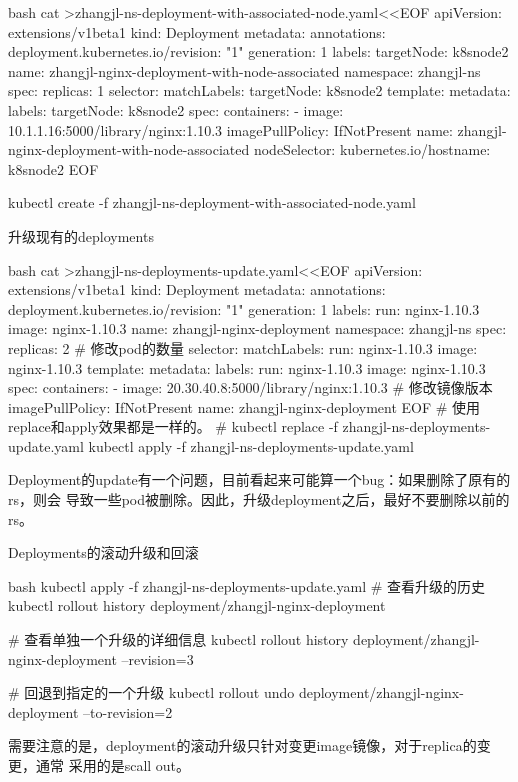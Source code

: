 \begin{outline}[enumerate]
\begin{code-in-enumerate}{bash}
cat >zhangjl-ns-deployment-with-associated-node.yaml<<EOF
apiVersion: extensions/v1beta1
kind: Deployment
metadata:
  annotations:
    deployment.kubernetes.io/revision: "1"
  generation: 1
  labels:
    targetNode: k8snode2
  name: zhangjl-nginx-deployment-with-node-associated
  namespace: zhangjl-ns
spec:
  replicas: 1
  selector:
    matchLabels:
      targetNode: k8snode2
  template:
    metadata:
      labels:
        targetNode: k8snode2
    spec:
      containers:
      - image: 10.1.1.16:5000/library/nginx:1.10.3
        imagePullPolicy: IfNotPresent
        name: zhangjl-nginx-deployment-with-node-associated
      nodeSelector:
        kubernetes.io/hostname: k8snode2
EOF

kubectl create -f zhangjl-ns-deployment-with-associated-node.yaml
\end{code-in-enumerate}

\1 升级现有的deployments
\begin{code-in-enumerate}{bash}
cat >zhangjl-ns-deployments-update.yaml<<EOF
apiVersion: extensions/v1beta1
kind: Deployment
metadata:
  annotations:
    deployment.kubernetes.io/revision: "1"
  generation: 1
  labels:
    run: nginx-1.10.3
    image: nginx-1.10.3
  name: zhangjl-nginx-deployment
  namespace: zhangjl-ns
spec:
  replicas: 2 # 修改pod的数量
  selector:
    matchLabels:
      run: nginx-1.10.3
      image: nginx-1.10.3
  template:
    metadata:
      labels:
        run: nginx-1.10.3
        image: nginx-1.10.3
    spec:
      containers:
      - image: 20.30.40.8:5000/library/nginx:1.10.3 # 修改镜像版本
        imagePullPolicy: IfNotPresent
        name: zhangjl-nginx-deployment
EOF
# 使用replace和apply效果都是一样的。
# kubectl replace -f zhangjl-ns-deployments-update.yaml
kubectl apply -f zhangjl-ns-deployments-update.yaml
\end{code-in-enumerate}
Deployment的update有一个问题，目前看起来可能算一个bug：如果删除了原有的rs，则会
导致一些pod被删除。因此，升级deployment之后，最好不要删除以前的rs。

\1 Deployments的滚动升级和回滚
\begin{code-in-enumerate}{bash}
kubectl apply -f zhangjl-ns-deployments-update.yaml
# 查看升级的历史
kubectl rollout history deployment/zhangjl-nginx-deployment

# 查看单独一个升级的详细信息
kubectl rollout history deployment/zhangjl-nginx-deployment --revision=3

# 回退到指定的一个升级
kubectl rollout undo deployment/zhangjl-nginx-deployment --to-revision=2
\end{code-in-enumerate}
需要注意的是，deployment的滚动升级只针对变更image镜像，对于replica的变更，通常
采用的是scall out。


\end{outline}
